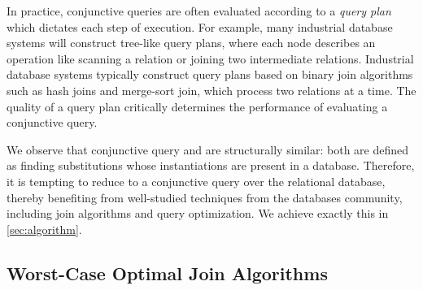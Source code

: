 In practice, conjunctive queries are often evaluated according to a \textit{query plan}
 which dictates each step of execution.
For example,
 many industrial database systems will construct tree-like query plans,
 where each node describes an operation like scanning a relation or joining two
 intermediate relations.
Industrial database systems typically construct query plans
 based on binary join algorithms such as hash joins and merge-sort join,
 which process two relations at a time.
The quality of a query plan critically
 determines the performance of evaluating a conjunctive query.

We observe that conjunctive query and \ematching
 are structurally similar: both are defined as finding
 substitutions whose instantiations are present in a database.
Therefore, it is tempting to reduce \ematching to
 a conjunctive query over the relational database,
 thereby benefiting from well-studied techniques from the databases community,
 including join algorithms and query optimization.
We achieve exactly this in \autoref{sec:algorithm}.

\subsection{Worst-Case Optimal Join Algorithms}



